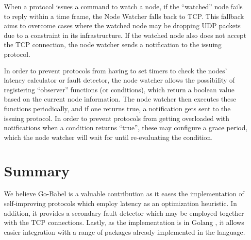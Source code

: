 When a protocol issues a command to watch a node, if the ``watched'' node fails to reply within a time frame, the Node Watcher falls back to TCP. This fallback aims to overcome cases where the watched node may be dropping UDP packets due to a constraint in its infrastructure. If the watched node also does not accept the TCP connection, the node watcher sends a notification to the issuing protocol.


In order to prevent protocols from having to set timers to check the nodes' latency calculator or fault detector, the node watcher allows the possibility of registering ``observer'' functions (or conditions), which return a boolean value based on the current node information. The node watcher then executes these functions periodically, and if one returns true, a notification gets sent to the issuing protocol. In order to prevent protocols from getting overloaded with notifications when a condition returns ``true'', these may configure a grace period, which the node watcher will wait for until re-evaluating the condition.

\section{Summary}

We believe Go-Babel is a valuable contribution as it eases the implementation of self-improving protocols which employ latency as an optimization heuristic. In addition, it provides a secondary fault detector which may be employed together with the TCP connections. Lastly, as the implementation is in Golang , it allows easier integration with a range of packages already implemented in the language. 
